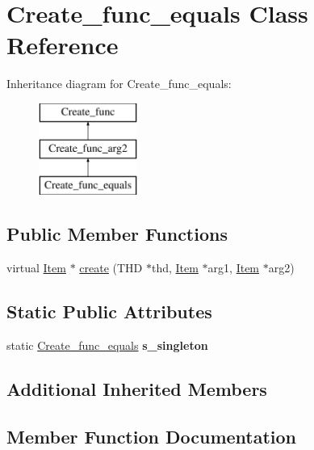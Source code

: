 \hypertarget{classCreate__func__equals}{}\section{Create\+\_\+func\+\_\+equals Class Reference}
\label{classCreate__func__equals}
Inheritance diagram for Create\+\_\+func\+\_\+equals\+:\begin{figure}[H]
\begin{center}
\leavevmode
\includegraphics[height=3.000000cm]{classCreate__func__equals}
\end{center}
\end{figure}
\subsection*{Public Member Functions}
\begin{DoxyCompactItemize}
\item 
virtual \mbox{\hyperlink{classItem}{Item}} $\ast$ \mbox{\hyperlink{classCreate__func__equals_ab1c33b508b5c9e5115cf94351f61c52d}{create}} (T\+HD $\ast$thd, \mbox{\hyperlink{classItem}{Item}} $\ast$arg1, \mbox{\hyperlink{classItem}{Item}} $\ast$arg2)
\end{DoxyCompactItemize}
\subsection*{Static Public Attributes}
\begin{DoxyCompactItemize}
\item 
\mbox{\label{classCreate__func__equals_addb5f31a50449d110664cd18ba94e577}} 
static \mbox{\hyperlink{classCreate__func__equals}{Create\+\_\+func\+\_\+equals}} {\bfseries s\+\_\+singleton}
\end{DoxyCompactItemize}
\subsection*{Additional Inherited Members}


\subsection{Member Function Documentation}
\mbox{\label{classCreate__func__equals_ab1c33b508b5c9e5115cf94351f61c52d}} 

